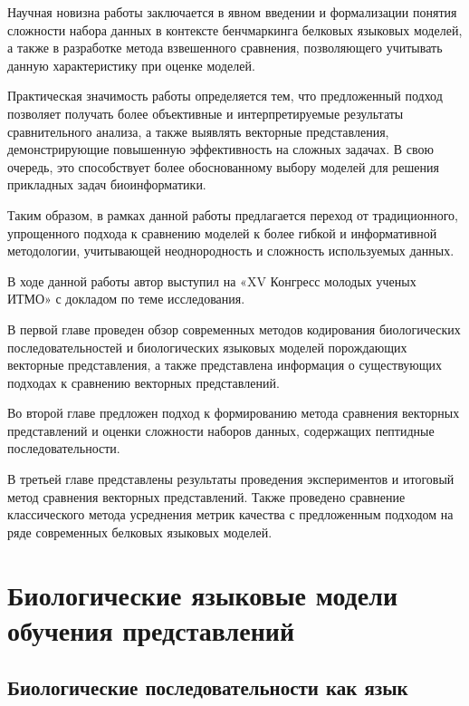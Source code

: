 \documentclass[specification,annotation,times]{itmo-student-thesis}
\begin{document}
Научная новизна работы заключается в явном введении и формализации понятия сложности набора данных в контексте бенчмаркинга белковых языковых моделей, а также в разработке метода взвешенного сравнения, позволяющего учитывать данную характеристику при оценке моделей.

Практическая значимость работы определяется тем, что предложенный подход позволяет получать более объективные и интерпретируемые результаты сравнительного анализа, а также выявлять векторные представления, демонстрирующие повышенную эффективность на сложных задачах. В свою очередь, это способствует более обоснованному выбору моделей для решения прикладных задач биоинформатики.

Таким образом, в рамках данной работы предлагается переход от традиционного, упрощенного подхода к сравнению моделей к более гибкой и информативной методологии, учитывающей неоднородность и сложность используемых данных.

В ходе данной работы автор выступил на «XV Конгресс молодых ученых ИТМО» с докладом по теме исследования.

В первой главе проведен обзор современных методов кодирования биологических последовательностей и биологических языковых моделей порождающих векторные представления, а также представлена информация о существующих подходах к сравнению векторных представлений.

Во второй главе предложен подход к формированию метода сравнения векторных представлений и оценки сложности наборов данных, содержащих пептидные последовательности.

В третьей главе представлены результаты проведения экспериментов и итоговый метод сравнения векторных представлений. Также проведено сравнение классического метода усреднения метрик качества с предложенным подходом на ряде современных белковых языковых моделей.


\chapter{Биологические языковые модели обучения представлений}

\section{Биологические последовательности как язык}\label{sec:bio-sec-lang}
\end{document}
